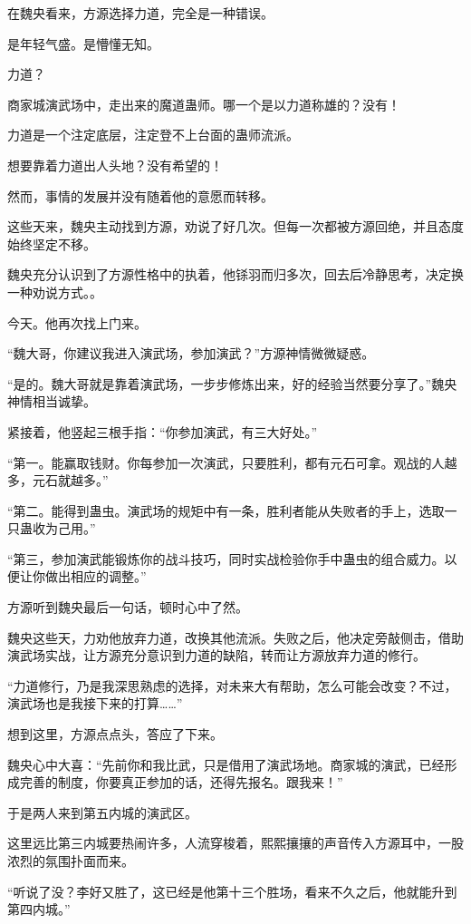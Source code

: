 \begin{this_body}
在魏央看来，方源选择力道，完全是一种错误。

是年轻气盛。是懵懂无知。

力道？

商家城演武场中，走出来的魔道蛊师。哪一个是以力道称雄的？没有！

力道是一个注定底层，注定登不上台面的蛊师流派。

想要靠着力道出人头地？没有希望的！

然而，事情的发展并没有随着他的意愿而转移。

这些天来，魏央主动找到方源，劝说了好几次。但每一次都被方源回绝，并且态度始终坚定不移。

魏央充分认识到了方源性格中的执着，他铩羽而归多次，回去后冷静思考，决定换一种劝说方式。。

今天。他再次找上门来。

“魏大哥，你建议我进入演武场，参加演武？”方源神情微微疑惑。

“是的。魏大哥就是靠着演武场，一步步修炼出来，好的经验当然要分享了。”魏央神情相当诚挚。

紧接着，他竖起三根手指：“你参加演武，有三大好处。”

“第一。能赢取钱财。你每参加一次演武，只要胜利，都有元石可拿。观战的人越多，元石就越多。”

“第二。能得到蛊虫。演武场的规矩中有一条，胜利者能从失败者的手上，选取一只蛊收为己用。”

“第三，参加演武能锻炼你的战斗技巧，同时实战检验你手中蛊虫的组合威力。以便让你做出相应的调整。”

方源听到魏央最后一句话，顿时心中了然。

魏央这些天，力劝他放弃力道，改换其他流派。失败之后，他决定旁敲侧击，借助演武场实战，让方源充分意识到力道的缺陷，转而让方源放弃力道的修行。

“力道修行，乃是我深思熟虑的选择，对未来大有帮助，怎么可能会改变？不过，演武场也是我接下来的打算……”

想到这里，方源点点头，答应了下来。

魏央心中大喜：“先前你和我比武，只是借用了演武场地。商家城的演武，已经形成完善的制度，你要真正参加的话，还得先报名。跟我来！”

于是两人来到第五内城的演武区。

这里远比第三内城要热闹许多，人流穿梭着，熙熙攘攘的声音传入方源耳中，一股浓烈的氛围扑面而来。

“听说了没？李好又胜了，这已经是他第十三个胜场，看来不久之后，他就能升到第四内城。”


\end{this_body}
